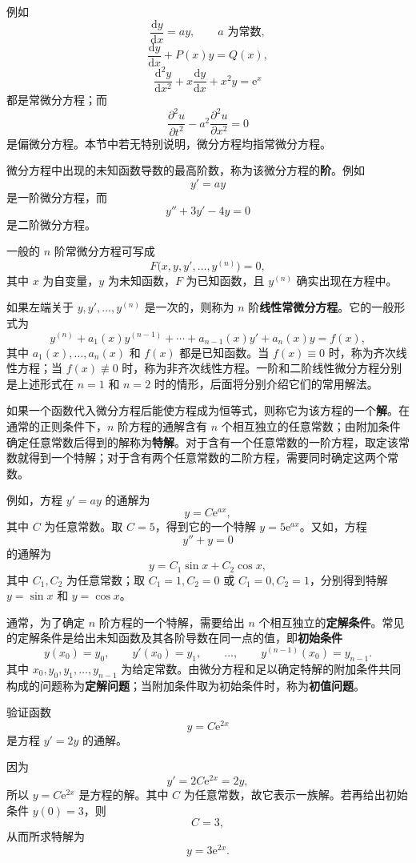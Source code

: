 \documentclass[fontset=fandol]{ctexart}
\newcommand{\dd}{\mathrm{d}}
\newcommand{\ee}{\mathrm{e}}
\begin{document}
例如
\[
\frac{\dd y}{\dd x}=ay,\qquad a\text{ 为常数},
\]
\[
\frac{\dd y}{\dd x}+P(x)y=Q(x),
\]
\[
\frac{\dd^2y}{\dd x^2}+x\frac{\dd y}{\dd x}+x^2y=\ee^x
\]
都是常微分方程；而
\[
\frac{\partial^2u}{\partial t^2}-a^2\frac{\partial^2u}{\partial x^2}=0
\]
是偏微分方程。本节中若无特别说明，微分方程均指常微分方程。

\begin{definition}[阶]
微分方程中出现的未知函数导数的最高阶数，称为该微分方程的\textbf{阶}。例如
\[
y'=ay
\]
是一阶微分方程，而
\[
y''+3y'-4y=0
\]
是二阶微分方程。
\end{definition}

一般的 $n$ 阶常微分方程可写成
\[
F\bigl(x,y,y',\ldots,y^{(n)}\bigr)=0,
\]
其中 \(x\) 为自变量，\(y\) 为未知函数，\(F\) 为已知函数，且 \(y^{(n)}\) 确实出现在方程中。

如果左端关于 \(y,y',\ldots,y^{(n)}\) 是一次的，则称为 \(n\) 阶\textbf{线性常微分方程}。它的一般形式为
\[
y^{(n)}+a_1(x)y^{(n-1)}+\cdots+a_{n-1}(x)y'+a_n(x)y=f(x),
\]
其中 \(a_1(x),\ldots,a_n(x)\) 和 \(f(x)\) 都是已知函数。当 \(f(x)\equiv0\) 时，称为齐次线性方程；当 \(f(x)\not\equiv0\) 时，称为非齐次线性方程。一阶和二阶线性微分方程分别是上述形式在 \(n=1\) 和 \(n=2\) 时的情形，后面将分别介绍它们的常用解法。

如果一个函数代入微分方程后能使方程成为恒等式，则称它为该方程的一个\textbf{解}。在通常的正则条件下，\(n\) 阶方程的通解含有 \(n\) 个相互独立的任意常数；由附加条件确定任意常数后得到的解称为\textbf{特解}。对于含有一个任意常数的一阶方程，取定该常数就得到一个特解；对于含有两个任意常数的二阶方程，需要同时确定这两个常数。

例如，方程 \(y'=ay\) 的通解为
\[
y=C\ee^{ax},
\]
其中 $C$ 为任意常数。取 $C=5$，得到它的一个特解 $y=5\ee^{ax}$。又如，方程
\[
y''+y=0
\]
的通解为
\[
y=C_1\sin x+C_2\cos x,
\]
其中 $C_1,C_2$ 为任意常数；取 $C_1=1,C_2=0$ 或 $C_1=0,C_2=1$，分别得到特解 $y=\sin x$ 和 $y=\cos x$。

通常，为了确定 $n$ 阶方程的一个特解，需要给出 $n$ 个相互独立的\textbf{定解条件}。常见的定解条件是给出未知函数及其各阶导数在同一点的值，即\textbf{初始条件}
\[
y(x_0)=y_0,\qquad y'(x_0)=y_1,\qquad\ldots,\qquad y^{(n-1)}(x_0)=y_{n-1}.
\]
其中 $x_0,y_0,y_1,\ldots,y_{n-1}$ 为给定常数。由微分方程和足以确定特解的附加条件共同构成的问题称为\textbf{定解问题}；当附加条件取为初始条件时，称为\textbf{初值问题}。

\begin{example}[验证解]
验证函数
\[
y=C\ee^{2x}
\]
是方程 $y'=2y$ 的通解。

因为
\[
y'=2C\ee^{2x}=2y,
\]
所以 $y=C\ee^{2x}$ 是方程的解。其中 $C$ 为任意常数，故它表示一族解。若再给出初始条件 $y(0)=3$，则
\[
C=3,
\]
从而所求特解为
\[
y=3\ee^{2x}.
\]
\end{example}
\end{document}
